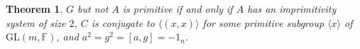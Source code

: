 \documentclass[12pt]{amsart}
\newtheorem{theorem}{Theorem}[section]
\newtheorem{lemma}[theorem]{Lemma}
\theoremstyle{definition}
\theoremstyle{remark}
\newtheorem*{remark}{Remark}
\begin{document}
%
%
\begin{theorem}
\label{firstclassif}
 $G$ but not $A$ is primitive if and only if $A$ has an 
 imprimitivity system 
 of size $2$,  
 $C$ is conjugate to $\langle (x,x) \rangle$ 
 for some primitive subgroup 
$\langle x \rangle$ of 
 $\mathrm{GL}(m, \mathbb{F})$, and 
 $a^2 = g^2 = [a, g] = -1_n$.
\end{theorem}
\end{document}
